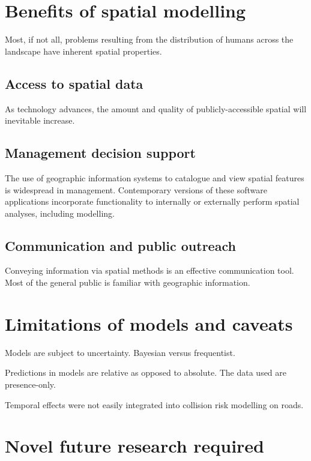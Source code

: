 \section{Benefits of spatial modelling}

Most, if not all, problems resulting from the distribution of humans across the landscape have inherent spatial properties. 

\subsection{Access to spatial data}

As technology advances, the amount and quality of publicly-accessible spatial will inevitable increase.

\subsection{Management decision support}

The use of geographic information systems to catalogue and view spatial features is widespread in management. Contemporary versions of these software applications incorporate functionality to internally or externally perform spatial analyses, including modelling.

\subsection{Communication and public outreach}

Conveying information via spatial methods is an effective communication tool. Most of the general public is familiar with geographic information.

\section{Limitations of models and caveats}

Models are subject to uncertainty.
Bayesian versus frequentist.

Predictions in models are relative as opposed to absolute.
The data used are presence-only.

Temporal effects were not easily integrated into collision risk modelling on roads.

\section{Novel future research required}

